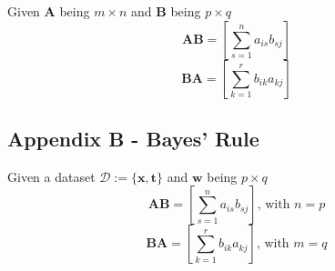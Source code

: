 \begin{frame}{\insertsubsection}

\begin{definition}
Given $\mathbf{A}$ being $m \times n$ and $\mathbf{B}$ being $p \times q$
\begin{equation*}
\mathbf{A}\mathbf{B} = \left[ \sum^n_{s=1} a_{is}b_{sj} \right]
\end{equation*}
\begin{equation*}
\mathbf{B}\mathbf{A} = \left[ \sum^r_{k=1} b_{ik}a_{kj} \right]
\end{equation*}
\end{definition}

\end{frame}

\subsection{Appendix B - Bayes' Rule}

\begin{frame}{\insertsubsection}

\begin{definition}
Given a dataset $\mathcal{D} := \{ \mathbf{x},\mathbf{t} \}$ and $\mathbf{w}$ being $p \times q$
\begin{equation*}
\mathbf{A}\mathbf{B} = \left[ \sum^n_{s=1} a_{is}b_{sj} \right] \text{, with } n = p 
\end{equation*}
\begin{equation*}
\mathbf{B}\mathbf{A} = \left[ \sum^r_{k=1} b_{ik}a_{kj} \right] \text{, with } m = q
\end{equation*}
\end{definition}

\end{frame}